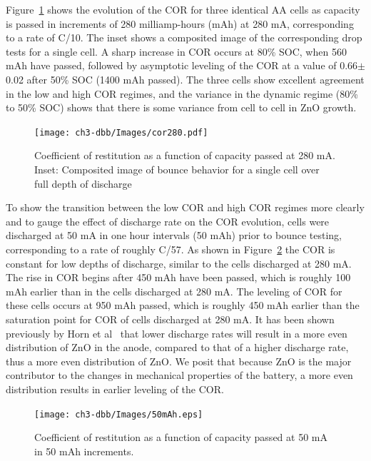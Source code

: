 {Figure~\ref{fig:COR1to3} shows the evolution of the COR for three identical AA cells as capacity is passed in increments of 280 milliamp-hours (mAh) at 280 mA, corresponding to a rate of C/10. The inset shows a composited image of the corresponding drop tests for a single cell. A sharp increase in COR occurs at 80\% SOC, when 560 mAh have passed, followed by asymptotic leveling of the COR at a value of 0.66\(\pm\) 0.02 after 50\% SOC (1400 mAh passed).  The three cells show excellent agreement in the low and high COR regimes, and the variance in the dynamic regime (80\% to 50\% SOC) shows that there is some variance from cell to cell in ZnO growth.

\clearpage

\begin{figure}[hbt]
  \centering
    \texttt{[image: ch3-dbb/Images/cor280.pdf]}
    \caption[Coefficient of restitution evolution at 280 mA.]{Coefficient of restitution as a function of capacity passed at 280 mA. Inset: Composited image of bounce behavior for a single cell over full depth of discharge}
    \label{fig:COR1to3}
\end{figure}

To show the transition between the low COR and high COR regimes more clearly and to gauge the effect of discharge rate on the COR evolution, cells were discharged at 50 mA in one hour intervals (50 mAh) prior to bounce testing, corresponding to a rate of roughly C/57. As shown in Figure~\ref{fig:50mah} the COR is constant for low depths of discharge, similar to the cells discharged at 280 mA. The rise in COR begins after 450 mAh have been passed, which is roughly 100 mAh earlier than in the cells discharged at 280 mA. The leveling of COR for these cells occurs at 950 mAh passed, which is roughly 450 mAh earlier than the saturation point for COR of cells discharged at 280 mA. It has been shown previously by Horn et al~\cite{horn} that lower discharge rates will result in a more even distribution of ZnO in the anode, compared to that of a higher discharge rate, thus a more even distribution of ZnO. We posit that because ZnO is the major contributor to the changes in mechanical properties of the battery, a more even distribution results in earlier leveling of the COR.

\begin{figure}[ht]
  \centering
    \texttt{[image: ch3-dbb/Images/50mAh.eps]}
    \caption[Coefficient of restitution evolution at 50 mA.]{Coefficient of restitution as a function of capacity passed at 50 mA in 50 mAh increments.}
    \label{fig:50mah}
\end{figure}


}
